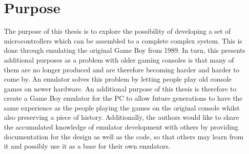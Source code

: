 \section{Purpose}
The purpose of this thesis is to explore the possibility of developing a set of microcontrollers which can be assembled to a complete complex system. This is done through emulating the original Game Boy from 1989. In turn, this presents additional purposes as a problem with older gaming consoles is that many of them are no longer produced and are therefore becoming harder and harder to come by. An emulator solves this problem by letting people play old console games on newer hardware. An additional purpose of this thesis is therefore to create a Game Boy emulator for the PC to allow future generations to have the same experience as the people playing the games on the original console whilst also preserving a piece of history. Additionally, the authors would like to share the accumulated knowledge of emulator development with others by providing documentation for the design as well as the code, so that others may learn from it and possibly use it as a base for their own emulators.


